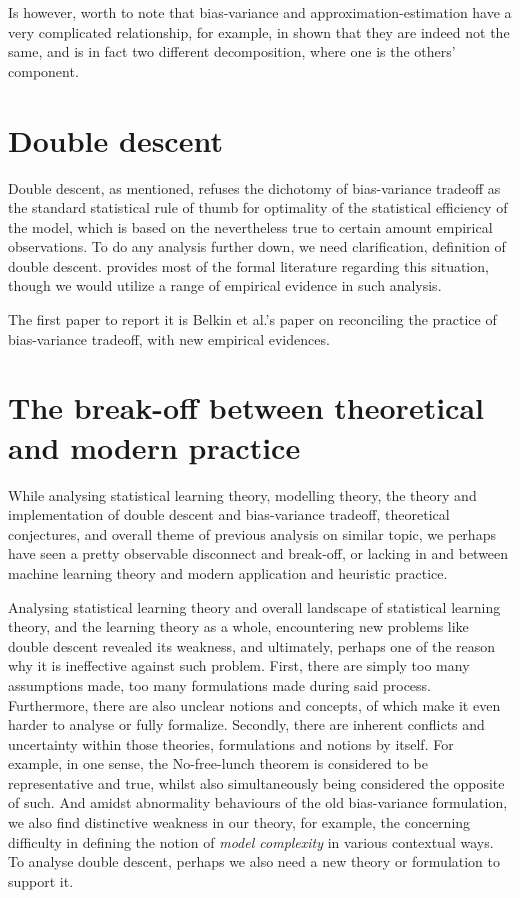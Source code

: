 Is however, worth to note that bias-variance and approximation-estimation have a very complicated relationship, for example, in \cite{brown2024biasvariance} shown that they are indeed not the same, and is in fact two different decomposition, where one is the others' component.

\section{Double descent}

Double descent, as mentioned, refuses the dichotomy of bias-variance tradeoff as the standard statistical rule of thumb for optimality of the statistical efficiency of the model, which is based on the nevertheless true to certain amount empirical observations. To do any analysis further down, we need clarification, definition of double descent. \cite{10.5555/2621980,10.5555/2371238} provides most of the formal literature regarding this situation, though we would utilize a range of empirical evidence in such analysis.

The first paper to report it is Belkin et al.'s paper \cite{belkin_reconciling_2019} on reconciling the practice of bias-variance tradeoff, with new empirical evidences. 

\section{The break-off between theoretical and modern practice}

While analysing statistical learning theory, modelling theory, the theory and implementation of double descent and bias-variance tradeoff, theoretical conjectures, and overall theme of previous analysis on similar topic, we perhaps have seen a pretty observable disconnect and break-off, or lacking in and between machine learning theory and modern application and heuristic practice. 

Analysing statistical learning theory and overall landscape of statistical learning theory, and the learning theory as a whole, encountering new problems like double descent revealed its weakness, and ultimately, perhaps one of the reason why it is ineffective against such problem. First, there are simply too many assumptions made, too many formulations made during said process. Furthermore, there are also unclear notions and concepts, of which make it even harder to analyse or fully formalize. Secondly, there are inherent conflicts and uncertainty within those theories, formulations and notions by itself. For example, in one sense, the No-free-lunch theorem is considered to be representative and true, whilst also simultaneously being considered the opposite of such. And amidst abnormality behaviours of the old bias-variance formulation, we also find distinctive weakness in our theory, for example, the concerning difficulty in defining the notion of \textit{model complexity} in various contextual ways. To analyse double descent, perhaps we also need a new theory or formulation to support it. 

